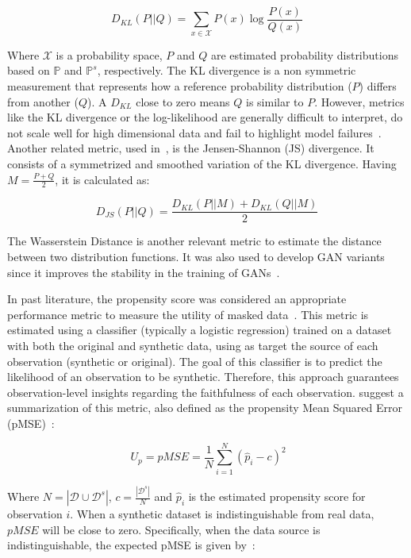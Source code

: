 \documentclass[parskip=full]{scrartcl}
\begin{document}
\begin{equation}
    D_{KL}(P||Q) = \sum_{x\in\mathcal{X}}P(x)\log{\frac{P(x)}{Q(x)}}
\end{equation}

Where $\mathcal{X}$ is a probability space, $P$ and $Q$ are estimated
probability distributions based on $\mathbb{P}$ and $\mathbb{P}^s$,
respectively. The KL divergence is a non symmetric measurement that represents
how a reference probability distribution ($P$) differs from another
($Q$). A $D_{KL}$ close to zero means $Q$ is similar to $P$. However, metrics
like the KL divergence or the log-likelihood are generally difficult to
interpret, do not scale well for high dimensional data and fail to
highlight model failures~\cite{alaa2022faithful}. Another related metric, used
in~\cite{zhao2021ctab}, is the Jensen-Shannon (JS) divergence. It consists of
a symmetrized and smoothed variation of the KL divergence. Having
$M=\frac{P+Q}{2}$, it is calculated as:

\begin{equation}
    D_{JS}(P||Q) = \frac{D_{KL}(P||M) + D_{KL}(Q||M)}{2}
\end{equation}

The Wasserstein Distance is another relevant metric to estimate the
distance between two distribution functions. It was also used to develop GAN
variants since it improves the stability in the training of
GANs~\cite{gulrajani2017improved, goncalves2020generation}.

In past literature, the propensity score was considered an appropriate
performance metric to measure the utility of masked data~\cite{woo2009global}.
This metric is estimated using a classifier (typically a logistic regression)
trained on a dataset with both the original and synthetic data, using as
target the source of each observation (synthetic or original). The goal of
this classifier is to predict the likelihood of an observation to be
synthetic. Therefore, this approach guarantees observation-level insights
regarding the faithfulness of each observation. \citet{woo2009global} suggest
a summarization of this metric, also defined as the propensity Mean Squared Error
(pMSE)~\cite{chundawat2022tabsyndex}:

\begin{equation}~\label{ep:propensity}
    U_p = pMSE = \frac{1}{N} \sum^N_{i=1}{(\hat{p}_i - c)}^2
\end{equation}

Where $N = |\mathcal{D} \cup \mathcal{D}^s|$, $c = \frac{|\mathcal{D}^s|}{N}$
and $\hat{p}_i$ is the estimated propensity score for observation $i$. When a
synthetic dataset is indistinguishable from real data, $pMSE$ will be close to
zero. Specifically, when the data source is indistinguishable, the expected
pMSE is given by~\cite{snoke2018general}:
\end{document}
